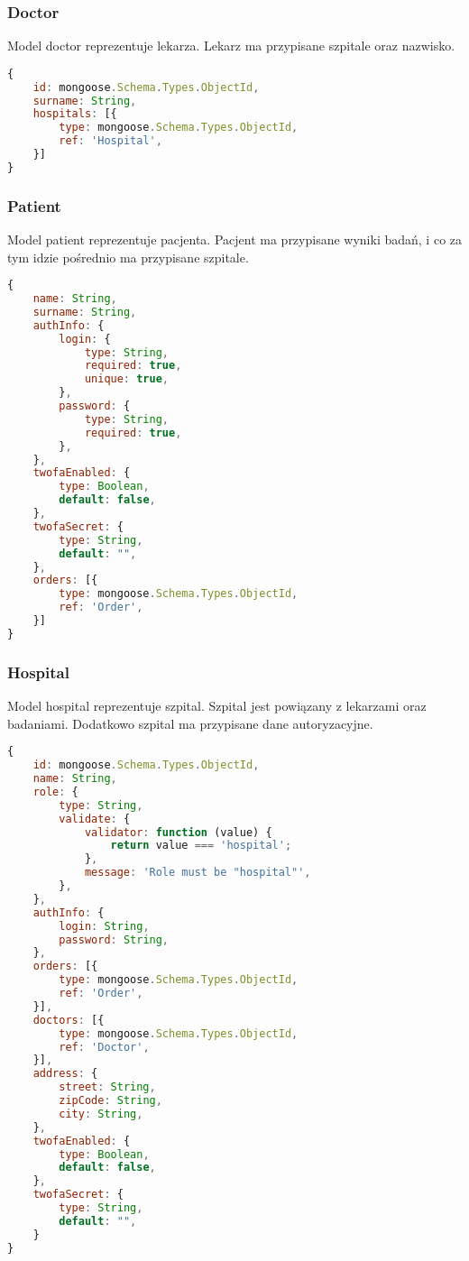 \documentclass{documentation}
\begin{document}
\subsubsection{Doctor}

Model doctor reprezentuje lekarza.
Lekarz ma przypisane szpitale oraz nazwisko.

\begin{lstlisting}[language=JavaScript]
{
    id: mongoose.Schema.Types.ObjectId,
    surname: String,
    hospitals: [{
        type: mongoose.Schema.Types.ObjectId,
        ref: 'Hospital',
    }]
}
\end{lstlisting}

\subsubsection{Patient}

Model patient reprezentuje pacjenta.
Pacjent ma przypisane wyniki badań, i co za tym idzie pośrednio ma przypisane szpitale.

\begin{lstlisting}[language=JavaScript]
{
    name: String,
    surname: String,
    authInfo: {
        login: {
            type: String,
            required: true,
            unique: true,
        },
        password: {
            type: String,
            required: true,
        },
    },
    twofaEnabled: {
        type: Boolean,
        default: false,
    },
    twofaSecret: {
        type: String,
        default: "",
    },
    orders: [{
        type: mongoose.Schema.Types.ObjectId,
        ref: 'Order',
    }]
}
\end{lstlisting}

\subsubsection{Hospital}

Model hospital reprezentuje szpital.
Szpital jest powiązany z lekarzami oraz badaniami.
Dodatkowo szpital ma przypisane dane autoryzacyjne.

\begin{lstlisting}[language=JavaScript]
{
    id: mongoose.Schema.Types.ObjectId,
    name: String,
    role: {
        type: String,
        validate: {
            validator: function (value) {
                return value === 'hospital';
            },
            message: 'Role must be "hospital"',
        },
    },
    authInfo: {
        login: String,
        password: String,
    },
    orders: [{
        type: mongoose.Schema.Types.ObjectId,
        ref: 'Order',
    }],
    doctors: [{
        type: mongoose.Schema.Types.ObjectId,
        ref: 'Doctor',
    }],
    address: {
        street: String,
        zipCode: String,
        city: String,
    },
    twofaEnabled: {
        type: Boolean,
        default: false,
    },
    twofaSecret: {
        type: String,
        default: "",
    }
}
\end{lstlisting}
\end{document}
